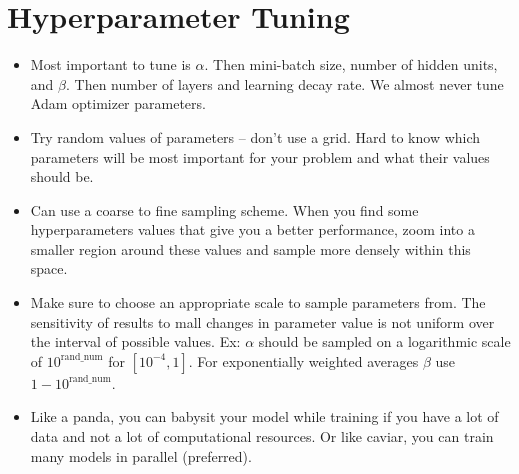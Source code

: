 \section{Hyperparameter Tuning}

\begin{itemize}[wide, labelwidth=!, labelindent=0pt]
\itemsep0em 
    \item Most important to tune is $\alpha$. Then mini-batch size, number of hidden units, and $\beta$. Then number of layers and learning decay rate. We almost never tune Adam optimizer parameters.
    \item Try random values of parameters -- don't use a grid. Hard to know which parameters will be most important for your problem and what their values should be.
    \item Can use a coarse to fine sampling scheme. When you find some hyperparameters values that give you a better performance, zoom into a smaller region around these values and sample more densely within this space. 
    \item Make sure to choose an appropriate scale to sample parameters from. The sensitivity of results to mall changes in parameter value is not uniform over the interval of possible values. Ex: $\alpha$ should be sampled on a logarithmic scale of $10^\text{rand\_num}$ for $[10^{-4}, 1]$. For exponentially weighted averages $\beta$ use $1 - 10^\text{rand\_num}$.
    \item Like a panda, you can babysit your model while training if you have a lot of data and not a lot of computational resources. Or like caviar, you can train many models in parallel (preferred). \vspace*{-\baselineskip}
\end{itemize}
